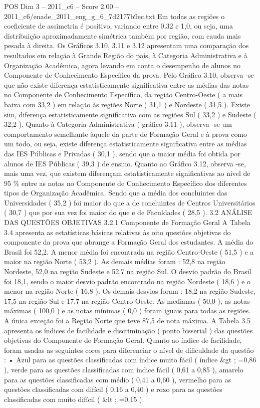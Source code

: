 \begin{textsample}{POS Dim 3 – 2011\_c6 – Score 2.00 – 2011\_c6/enade\_2011\_eng\_g\_6\_7d2177b9ec.txt}
Em todas as regiões o coeficiente de assimetria é positivo, variando entre 0,32 e 1,0, ou seja, uma distribuição aproximadamente simétrica também por região, com cauda mais pesada à direita.
Os Gráficos 3.10, 3.11 e 3.12 apresentam uma comparação dos resultados em relação à Grande Região do país, à Categoria Administrativa e à Organização Acadêmica, agora levando em conta o desempenho de alunos no Componente de Conhecimento Específico da prova.
Pelo Gráfico 3.10, observa -se que não existe diferença estatisticamente significativa entre as médias das notas no Componente de Conhecimento Específico, da região Centro-Oeste ( a mais baixa com 33,2 ) em relação às regiões Norte ( 31,1 ) e Nordeste ( 31,5 ).
Existe sim, diferença estatisticamente significativa com as regiões Sul ( 33,2 ) e Sudeste ( 32,2 ).
Quanto à Categoria Administrativa ( gráfico 3.11 ), observa -se um comportamento semelhante àquele da parte de Formação Geral e à prova como um todo, ou seja, existe diferença estatisticamente significativa entre as médias das IES Públicas e Privadas ( 30,1 ), sendo que a maior média foi obtida por alunos de IES Públicas ( 39,3 ) de ensino.
Quanto ao Gráfico 3.12, observa -se, mais uma vez, que existem diferençam estatisticamente significativas ao nível de 95 \% entre as notas no Componente de Conhecimento Específico dos diferentes tipos de Organização Acadêmica.
Sendo que a média dos concluintes das Universidades ( 35,2 ) foi maior do que a de concluintes de Centros Universitários ( 30,7 ) que por sua vez foi maior do que e de Faculdades ( 28,5 ). 3.2 ANÁLISE DAS QUESTÕES OBJETIVAS 3.2.1 Componente de Formação Geral A Tabela 3.4 apresenta as estatísticas básicas relativas às oito questões objetivas do componente da prova que abrange a Formação Geral dos estudantes.
A média do Brasil foi 52,2.
A menor média foi encontrada na região Centro-Oeste ( 51,5 ) e a maior na região Norte ( 53,2 ).
As demais médias foram : 52,8 na região Nordeste, 52,0 na região Sudeste e 52,7 na região Sul.
O desvio padrão do Brasil foi 18,1, sendo o maior desvio padrão encontrado na região Nordeste ( 18,6 ) e o menor na região Norte ( 16,8 ).
Os demais desvios foram : 18,2 na região Sudeste, 17,5 na região Sul e 17,7 na região Centro-Oeste.
As medianas ( 50,0 ), as notas máximas ( 100,0 ) e as notas mínimas ( 0,0 ) foram iguais para todas as regiões.
A única exceção foi a Região Norte que teve 87,5 de nota máxima.
A Tabela 3.5 apresenta os índices de facilidade e discriminação ( ponto bisserial ) das questões objetivas do Componente de Formação Geral.
Quanto ao índice de facilidade, foram usadas as seguintes cores para diferenciar o nível de dificuldade da questão : • Azul para as questões classificadas com índice muito fácil ( índice \&gt ; =0,86 ), verde para as questões classificadas com índice fácil ( 0,61 a 0,85 ), amarelo para as questões classificadas com médio ( 0,41 a 0,60 ), vermelho para as questões classificadas com difícil ( 0,16 a 0,40 ) e roxo para as questões classificadas com muito difícil ( \&lt ; =0,15 ).

\end{textsample}
